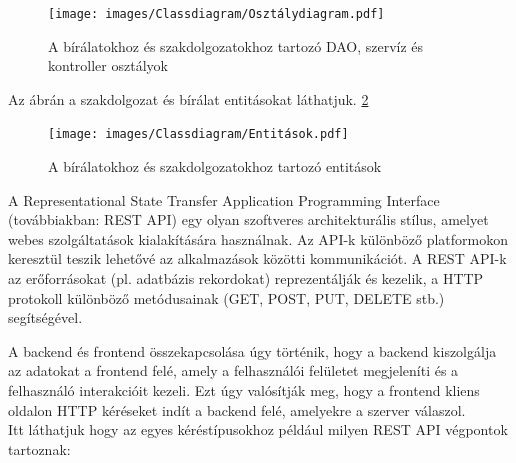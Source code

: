 \begin{figure}[ht]
	\texttt{[image: images/Classdiagram/Osztálydiagram.pdf]}
	\caption{A bírálatokhoz és szakdolgozatokhoz tartozó DAO, szervíz és kontroller osztályok}
	\label{fig:Osztálydiagram}
\end{figure}
Az ábrán a szakdolgozat és bírálat entitásokat láthatjuk. \ref{fig:Entitások}
\begin{figure}[h!]
	\texttt{[image: images/Classdiagram/Entitások.pdf]}
	\caption{A bírálatokhoz és szakdolgozatokhoz tartozó entitások}
	\label{fig:Entitások}
\end{figure}


A Representational State Transfer Application Programming Interface (továbbiakban: REST API)\cite{REST API} egy olyan szoftveres architekturális stílus, amelyet webes szolgáltatások kialakítására használnak. Az API-k különböző platformokon keresztül teszik lehetővé az alkalmazások közötti kommunikációt. A REST API-k\cite{REST API} az erőforrásokat (pl. adatbázis rekordokat) reprezentálják és kezelik, a HTTP\cite{http} protokoll különböző metódusainak (GET, POST, PUT, DELETE stb.) segítségével.

A backend és frontend összekapcsolása úgy történik, hogy a backend kiszolgálja az adatokat a frontend felé, amely a felhasználói felületet megjeleníti és a felhasználó interakcióit kezeli. Ezt úgy valósítják meg, hogy a frontend kliens oldalon HTTP\cite{http} kéréseket indít a backend felé, amelyekre a szerver válaszol.\\

Itt láthatjuk hogy az egyes kéréstípusokhoz például milyen REST API végpontok tartoznak:

